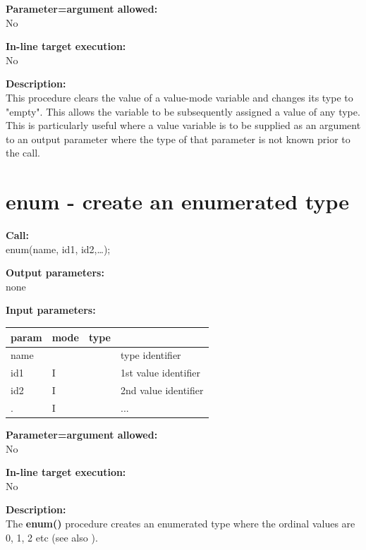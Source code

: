         {\bf Parameter=argument allowed:} \\
        No
        
        {\bf In-line target execution:} \\
        No
        
        {\bf Description:} \\
        This procedure clears the value of a value-mode variable and changes
        its type to "empty". This allows the variable to be subsequently
        assigned a value of any type. This is particularly useful where
        a value variable is to be supplied as an argument to an output
        parameter where the type of that parameter is not known prior to
        the call.


    \section{enum - create an enumerated type}\label{sec:ipenum}
        
        {\bf Call:} \\
        enum(name, id1, id2,\dots);
        
        {\bf Output parameters:} \\
        none
        
        {\bf Input parameters:} \\
        \begin{tabular}{| l | l | l | l |}
        \hline
        param  & mode     & type  & \\
        \hline \hline
        name &   &     & type identifier        \\ \hline
        id1  & I &     & 1st value identifier   \\ \hline
        id2  & I &     & 2nd value identifier   \\ \hline
         .   & I &     & ...                    \\ \hline
        \end{tabular}
        
        {\bf Parameter=argument allowed:} \\
        No
        
        {\bf In-line target execution:} \\
        No
        
        {\bf Description:} \\
        The {\bf enum()} procedure creates an enumerated type where the ordinal
        values are 0, 1, 2 etc (see also ).


